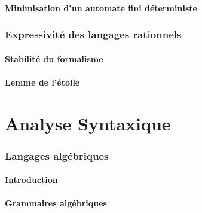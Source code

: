 \subsection{Minimisation d'un automate fini déterministe}








 
\section{Expressivité des langages rationnels}
 
\subsection{Stabilité du formalisme}



 
\subsection{Lemme de l'étoile}




 
 
\part{Analyse Syntaxique}
 
 
\section{Langages algébriques}
 
\subsection{Introduction}


 
\subsection{Grammaires algébriques}





 
